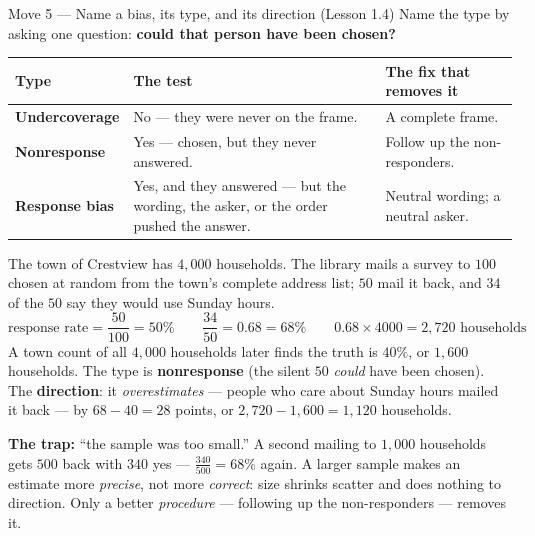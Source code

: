 \documentclass[10pt]{article}
\begin{document}
\vspace{3pt}
\boxguard[18]
\begin{notesbox}{Move 5 --- Name a bias, its type, and its direction (Lesson 1.4)}
\small
Name the type by asking one question: \textbf{could that person have been chosen?}

\vspace{2pt}
\renewcommand{\arraystretch}{1.25}
\begin{tabularx}{\linewidth}{@{} >{\bfseries}p{2.6cm} X X @{}}
\rowcolor{frost}
\textbf{Type} & \textbf{The test} & \textbf{The fix that removes it} \\
\midrule
Undercoverage & No --- they were never on the frame. & A complete frame. \\
Nonresponse & Yes --- chosen, but they never answered. & Follow up the non-responders. \\
Response bias & Yes, and they answered --- but the wording, the asker, or the order pushed
  the answer. & Neutral wording; a neutral asker. \\
\end{tabularx}

\vspace{3pt}
The town of Crestview has $4{,}000$ households. The library mails a survey to $100$ chosen at
random from the town's complete address list; $50$ mail it back, and $34$ of the $50$ say they
would use Sunday hours.
\[ \text{response rate} = \frac{50}{100} = 50\% \qquad \frac{34}{50} = 0.68 = 68\% \qquad
   0.68 \times 4000 = 2{,}720 \text{ households} \]
A town count of all $4{,}000$ households later finds the truth is $40\%$, or $1{,}600$
households. The type is \textbf{nonresponse} (the silent $50$ \emph{could} have been chosen).
The \textbf{direction}: it \emph{overestimates} --- people who care about Sunday hours mailed
it back --- by $68 - 40 = 28$ points, or $2{,}720 - 1{,}600 = 1{,}120$ households.

\vspace{3pt}
\textbf{The trap:} ``the sample was too small.'' A second mailing to $1{,}000$ households gets
$500$ back with $340$ yes --- $\frac{340}{500} = 68\%$ again. A larger sample makes an estimate
more \emph{precise}, not more \emph{correct}: size shrinks scatter and does nothing to
direction. Only a better \emph{procedure} --- following up the non-responders --- removes it.
\end{notesbox}
\end{document}

